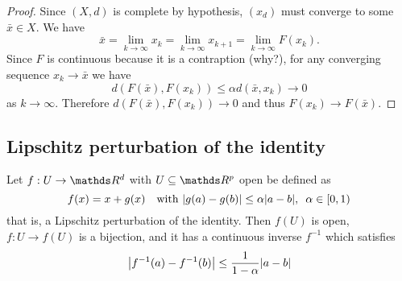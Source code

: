 \documentclass[12pt]{extarticle}
\numberwithin{equation}{section}
\begin{document}
\begin{proof}
    Since $(X, d)$ is complete by hypothesis, $(x_d)$ must converge to some $\bar x \in X$.
    We have
    \begin{equation}
        \bar x = \lim_{k \to \infty} x_k = \lim_{k \to \infty} x_{k + 1} = \lim_{k \to \infty} F(x_k).
    \end{equation}
    Since $F$ is continuous because it is a contraption (why?), for any converging sequence $x_k \to \bar x$ we have
    \begin{equation}
        d(F(\bar x), F(x_k)) \leq \alpha d(\bar x, x_k) \to 0
    \end{equation}
    as $k \to \infty$.
    Therefore $d(F(\bar x), F(x_k)) \to 0$ and thus $F(x_k) \to F(\bar x)$.
\end{proof}

\subsection{Lipschitz perturbation of the identity}

\begin{theorem}{}{}
    Let $f: U \to \R^d$ with $U \subseteq \R^p$ open be defined as
    \begin{equation}
        f(x) = x + g(x) \quad \text{with } \abs{g(a) - g(b)} \leq \alpha \abs{a - b}, \enspace \alpha \in [0,1)
    \end{equation}
    that is, a Lipschitz perturbation of the identity.
    Then $f(U)$ is open, $f: U \to f(U)$ is a bijection, and it has a continuous inverse $f^{-1}$
    which satisfies
    \begin{equation}
        \abs{f^{-1}(a)- f^{-1}(b)} \leq \frac{1}{1-\alpha} \abs{a-b}
    \end{equation}
\end{theorem}
\end{document}
